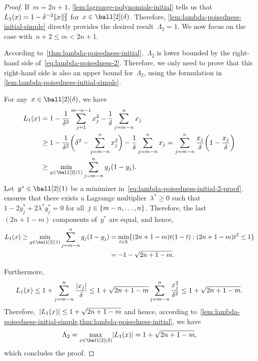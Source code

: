 \begin{proof}
    If~$m = 2n + 1$, \cref{lem:lagrange-polynomials-initial} tells us that~$\lagp[1](x) = 1 - \delta^{-2} \norm{x}_2^2$ for~$x \in \ball[2](\delta)$.
    Therefore, \cref{lem:lambda-poisedness-initial-simple} directly provides the desired result~$\Lambda_2 = 1$.
    We now focus on the case with~$n + 2 \le m < 2n + 1$.

    According to~\cref{thm:lambda-poisedness-initial},~$\Lambda_2$ is lower bounded by the right-hand side of~\cref{eq:lambda-poisedness-2}.
    Therefore, we only need to prove that this right-hand side is also an upper bound for~$\Lambda_2$, using the formulation in \cref{lem:lambda-poisedness-initial-simple}.
    
    For any~$x \in \ball[2](\delta)$, we have
    \begin{subequations}
        \begin{align}
            \lagp[1](x) &= 1 - \frac{1}{\delta^2} \sum_{j = 1}^{m - n - 1} x_j^2 - \frac{1}{\delta} \sum_{j = m - n}^n x_j\\
                        &\ge 1 - \frac{1}{\delta^2} \bigg( \delta^2 - \sum_{j = m - n}^n x_j^2 \bigg) - \frac{1}{\delta} \sum_{j = m - n}^n x_j = \sum_{j = m - n}^n \frac{x_j}{\delta} \bigg( 1 - \frac{x_j}{\delta} \bigg)\\
                        &\ge \min_{y \in \ball[2](1)} \sum_{j = m - n}^n y_j (1 - y_j). \label{eq:lambda-poisedness-initial-2-proof}
        \end{align}
    \end{subequations}
    Let~$y^{\ast} \in \ball[2](1)$ be a minimizer in~\cref{eq:lambda-poisedness-initial-2-proof}.
     ensures that there exists a Lagrange multiplier~$\lambda^{\ast} \ge 0$ such that~$1 - 2 y_j^{\ast} + 2 \lambda^{\ast} y_j^{\ast} = 0$ for all~$j \in \{m - n, \dots, n\}$.
    Therefore, the last~$(2n + 1 - m)$ components of~$y^{\ast}$ are equal, and hence,
    \begin{align*}
        \lagp[1](x) \ge \min_{y \in \ball[2](1)} \sum_{j = m - n}^n y_j (1 - y_j)   &= \min_{t \in \R} \set{(2n + 1 - m) t (1 - t) : (2n + 1 - m) t^2 \le 1}\\
                                                                                    &= -1 - \sqrt{2n + 1 - m}.
    \end{align*}

    Furthermore,
    \begin{equation*}
        \lagp[1](x) \le 1 + \sum_{j = m - n}^n \frac{\abs{x_j}}{\delta} \le 1 + \sqrt{2n + 1 - m} \sum_{j = m - n}^n \frac{x_j^2}{\delta^2} \le 1 + \sqrt{2n + 1 - m}.
    \end{equation*}
    Therefore,~$\abs{\lagp[1](x)} \le 1 + \sqrt{2n + 1 - m}$ and hence, according to~\cref{lem:lambda-poisedness-initial-simple,thm:lambda-poisedness-initial}, we have
    \begin{equation*}
        \Lambda_2 = \max_{x \in \ball[2](\delta)} \abs{\lagp[1](x)} = 1 + \sqrt{2n + 1 - m},
    \end{equation*}
    which concludes the proof.
\end{proof}

